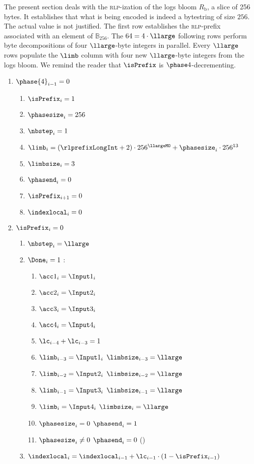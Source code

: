 \begin{center}
\end{center}

The present section deals with the \textsc{rlp}-ization of the logs bloom $R_\text{b}$, a slice of 256 bytes. It establishes that what is being encoded is indeed a bytestring of size $256$. The actual value is not justified. The first row establishes the \textsc{rlp}-prefix associated with an element of $\mathbb{B}_{256}$. The $64 = 4 \cdot \llarge$ following rows perform byte decompositions of four $\llarge$-byte integers in parallel. Every $\llarge$ rows populate the $\limb$ column with four new $\llarge$-byte integers from the logs bloom.
We remind the reader that $\isPrefix$ is $\phase 4$-decrementing.
\begin{enumerate}
	\item \If $\phase{4}_{i-1}=0$ \Then 
		\begin{enumerate}
			\item $\isPrefix_{i}=1$
			\item $\phasesize_{i}=256$
			\item $\nbstep_{i}=1$
			\item $\limb_{i}=(\rlprefixLongInt + 2) \cdot 256^{\llargeMO} + \phasesize_{i} \cdot 256 ^{13}$
			\item $\limbsize_{i}=3$
			\item $\phasend_{i}=0$
			\item $\isPrefix_{i+1}=0$
			\item $\indexlocal_{i}=0$
		\end{enumerate}
	\item \If $\isPrefix_{i}=0$ \Then
		\begin{enumerate}
			\item $\nbstep_{i}=\llarge$
			\item \If $\Done_{i}=1$ \Then:
				\begin{enumerate}
					\item $\acc 1_{i}=\Input 1_{i}$
					\item $\acc 2_{i}=\Input 2_{i}$
					\item $\acc 3_{i}=\Input 3_{i}$
					\item $\acc 4_{i}=\Input 4_{i}$
					\item $\lc_{i-4}+\lc_{i-3}=1$
					\item $\limb_{i-3}=\Input 1 _{i}$ \et $\limbsize_{i-3}=\llarge$
					\item $\limb_{i-2}=\Input 2 _{i}$ \et $\limbsize_{i-2}=\llarge$
					\item $\limb_{i-1}=\Input 3 _{i}$ \et $\limbsize_{i-1}=\llarge$
					\item $\limb_{i}=\Input 4 _{i}$   \et $\limbsize_{i}=\llarge$
					\item \If $\phasesize_{i}=0$ \Then $\phasend_{i}=1$
					\item \If $\phasesize_{i} \neq 0$ \Then $\phasend_{i}=0$ (\trash)
				\end{enumerate}
			\item $\indexlocal_{i}=\indexlocal_{i-1}+\lc_{i-1} \cdot (1 - \isPrefix_{i-1})$
		\end{enumerate}
\end{enumerate}
